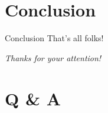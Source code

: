 \documentclass{beamer}
\begin{document}



    




    


\section{Conclusion}

\begin{frame}{Conclusion}
	That's all folks!
\end{frame}

	\begin{frame}
		\centering
		\Huge{\textsf{\textit{Thanks for your attention!}}}
	\end{frame}

\section*{Q \& A}

\end{document}

